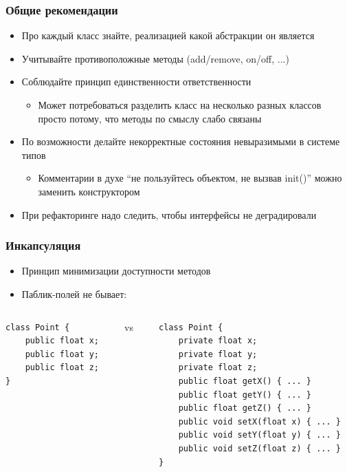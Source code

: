 \documentclass[xetex,mathserif,serif]{beamer}
\begin{document}
	\begin{frame}
		\frametitle{Общие рекомендации}
		\begin{itemize}
			\item Про каждый класс знайте, реализацией какой абстракции он является
			\item Учитывайте противоположные методы (add/remove, on/off, ...)
			\item Соблюдайте принцип единственности ответственности
			\begin{itemize}
				\item Может потребоваться разделить класс на несколько разных классов просто потому, что методы по смыслу слабо связаны
			\end{itemize}
			\item По возможности делайте некорректные состояния невыразимыми в системе типов
			\begin{itemize}
				\item Комментарии в духе ``не пользуйтесь объектом, не вызвав  init()'' можно заменить конструктором
			\end{itemize}
			\item При рефакторинге надо следить, чтобы интерфейсы не деградировали
		\end{itemize}
	\end{frame}

	\begin{frame}[fragile]
		\frametitle{Инкапсуляция}
		\begin{itemize}
			\item Принцип минимизации доступности методов
			\item Паблик-полей не бывает:
		\end{itemize}
		\begin{columns}
			\begin{column}{0.25\textwidth}
				\begin{verbatim}
class Point {
    public float x;
    public float y;
    public float z;
}
				\end{verbatim}
			\end{column}
			\begin{column}{0.1\textwidth}
				vs
			\end{column}
			\begin{column}{0.5\textwidth}
				\begin{verbatim}
class Point {
    private float x;
    private float y;
    private float z;
    public float getX() { ... }
    public float getY() { ... }
    public float getZ() { ... }
    public void setX(float x) { ... }
    public void setY(float y) { ... }
    public void setZ(float z) { ... }
}
				\end{verbatim}
			\end{column}
		\end{columns}
	\end{frame}
\end{document}
